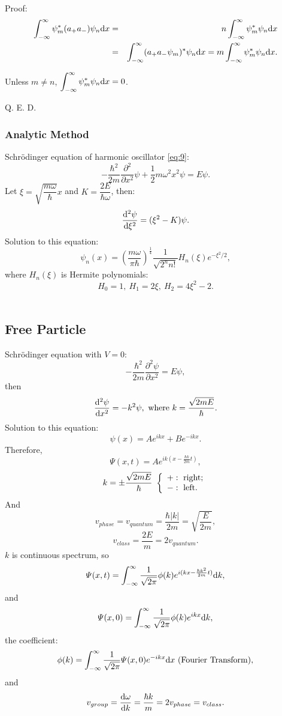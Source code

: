\documentclass[12pt, 
]{article}
\begin{document}
\noindent Proof: 
\begin{eqnarray*}
	\int_{-\infty}^{\infty}\psi_m^*(a_+a_{-})\psi_n{\rm d}x&=&n\int_{-\infty}^{\infty}\psi_m^*\psi_n{\rm d}x\\
	&=&\int_{-\infty}^{\infty}(a_+a_{-}\psi_m)^*\psi_n{\rm d}x=m\int_{-\infty}^{\infty}\psi_m^*\psi_n{\rm d}x.
\end{eqnarray*}

Unless $m\neq n$, $\displaystyle\int_{-\infty}^{\infty}\psi_m^*\psi_n{\rm d}x=0$.

Q. E. D.
~\\

\subsubsection{Analytic Method}
Schr\"odinger equation of harmonic oscillator \eqref{eq:9}:
\[	
	-\frac{\hbar^2}{2m}\frac{\partial^2}{\partial x^2}\psi+\frac{1}{2}m\omega^2x^2\psi=E\psi.
\]
Let $\xi=\sqrt{\dfrac{m\omega}{\hbar}}x$ and $K=\dfrac{2E}{\hbar\omega}$, then:
\[
	\frac{{\rm d}^2\psi}{{\rm d}\xi^2}=(\xi^2-K)\psi.
\]
Solution to this equation:
\[
	\psi_n(x)=\left(\frac{m\omega}{\pi\hbar}\right)^\frac{1}{4}\frac{1}{\sqrt{2^n n!}}H_n(\xi)e^{-\xi^2 /2},
\]
where $H_n(\xi)$ is Hermite polynomials:
\[
	H_0=1,~H_1=2\xi,~H_2=4\xi^2-2.
\]
~\\

\subsection{Free Particle}
Schr\"odinger equation with $V=0$:
\[
	-\frac{\hbar^2}{2m}\frac{\partial^2\psi}{\partial x^2}=E\psi,
\]
then
\[
	\frac{{\rm d}^2\psi}{{\rm d}x^2}=-k^2\psi,~{\rm{where}}~k=\frac{\sqrt{2mE}}{\hbar}.
\]
Solution to this equation:
\[
	\psi(x)=Ae^{ikx}+Be^{-ikx}.
\]
Therefore,
\[
	\varPsi(x,t)=Ae^{ik(x-\frac{\hbar k}{2m}t)},
\]
\[
	k=\pm\frac{\sqrt{2mE}}{\hbar}~\left\{
	\begin{array}{l}
		+:~{\rm right};\\
		-:~{\rm left}.
	\end{array}
	\right.
\]
And $$v_{phase}=v_{quantum}=\frac{\hbar|k|}{2m}=\sqrt{\frac{E}{2m}},$$
$$v_{class}=\frac{2E}{m}=2v_{quantum}.$$
$k$ is continuous spectrum, so
\[
	\varPsi(x,t)=\int_{-\infty}^{\infty}\frac{1}{\sqrt{2\pi}}\phi(k)e^{i(kx-\frac{\hbar k^2}{2m}t)}{{\rm d}}k,
\]
and
\[
	\varPsi(x,0)=\int_{-\infty}^{\infty}\frac{1}{\sqrt{2\pi}}\phi(k)e^{ikx}{\rm d}k,
\]
the coefficient:
\[
	\phi(k)=\int_{-\infty}^{\infty}\frac{1}{\sqrt{2\pi}}\varPsi(x,0)e^{-ikx}{\rm d}x~({\rm Fourier~Transform}),
\]
and
\[
	v_{group}=\frac{{\rm d}\omega}{{\rm d}k}=\frac{\hbar k}{m}=2v_{phase}=v_{class}.
\]
\end{document}
